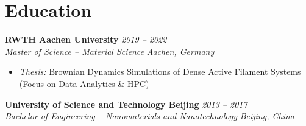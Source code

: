 \documentclass[11pt,a4paper]{article}
\newcommand{\resumeItem}[1]{
  \item \small{#1}
}
\newcommand{\resumeSubheading}[4]{
  \textbf{#1} \hfill \textit{#2} \\
  \textit{#3} \hfill \textit{#4}
}
\begin{document}
\vspace{2pt}

\section*{Education}

\resumeSubheading{RWTH Aachen University}{2019 -- 2022}{Master of Science -- Material Science}{Aachen, Germany}
\begin{itemize}[leftmargin=*, parsep=0pt, itemsep=2pt, topsep=2pt]
  \resumeItem{\textit{Thesis:} Brownian Dynamics Simulations of Dense Active Filament Systems (Focus on Data Analytics \& HPC)}
\end{itemize}

\vspace{2pt}

\resumeSubheading{University of Science and Technology Beijing}{2013 -- 2017}{Bachelor of Engineering -- Nanomaterials and Nanotechnology}{Beijing, China}
\end{document}
